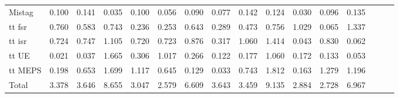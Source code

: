 \begin{tabular}{|l|ccc|ccc|ccc|ccc|ccc|}
      Mistag                                     & 0.100 & 0.141 & 0.035 & 0.100 & 0.056 & 0.090 & 0.077 & 0.142 & 0.124 & 0.030 & 0.096 & 0.135 \\ 
      tt fsr                                     & 0.760 & 0.583 & 0.743 & 0.236 & 0.253 & 0.643 & 0.289 & 0.473 & 0.756 & 1.029 & 0.065 & 1.337 \\ 
      tt isr                                     & 0.724 & 0.747 & 1.105 & 0.720 & 0.723 & 0.876 & 0.317 & 1.060 & 1.414 & 0.043 & 0.830 & 0.062 \\ 
      tt UE                                      & 0.021 & 0.037 & 1.665 & 0.306 & 1.017 & 0.266 & 0.122 & 0.177 & 1.060 & 0.172 & 0.133 & 0.053 \\ 
      tt MEPS                                    & 0.198 & 0.653 & 1.699 & 1.117 & 0.645 & 0.129 & 0.033 & 0.743 & 1.812 & 0.163 & 1.279 & 1.196 \\ 
      \hline
      Total                                      & 3.378 & 3.646 & 8.655 & 3.047 & 2.579 & 6.609 & 3.643 & 3.459 & 9.135 & 2.884 & 2.728 & 6.967 \\ 
      \hline
      \end{tabular}